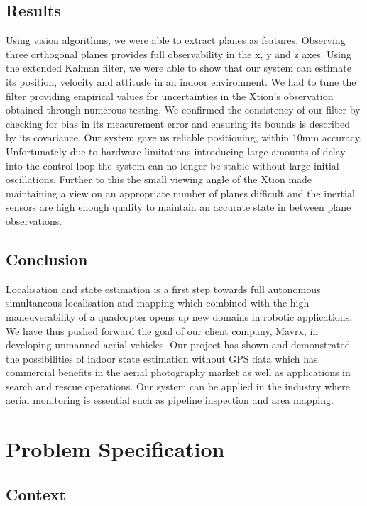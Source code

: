 \documentclass[]{article}
\begin{document}
{\subsection{Results}
Using vision algorithms, we were able to extract planes as features. Observing three orthogonal planes provides full observability in the x, y and z axes. Using the extended Kalman filter, we were able to show that our system can estimate its position, velocity and attitude in an indoor environment. We had to tune the filter providing empirical values for uncertainties in the Xtion's observation obtained through numerous testing. We confirmed the consistency of our filter by checking for bias in its measurement error and ensuring its bounds is described by its covariance. Our system gave us reliable positioning, within 10mm accuracy. Unfortunately due to hardware limitations introducing large amounts of delay into the control loop the system can no longer be stable without large initial oscillations. Further to this the small viewing angle of the Xtion made maintaining a view on an appropriate number of planes difficult and the inertial sensors are high enough quality to maintain an accurate state in between plane observations. 

\subsection{Conclusion}
Localisation and state estimation is a first step towards full autonomous simultaneous localisation and mapping which combined with the high maneuverability of a quadcopter opens up new domains in robotic applications. We have thus pushed forward the goal of our client company, Mavrx, in developing unmanned aerial vehicles. Our project has shown and demonstrated the possibilities of indoor state estimation without GPS data which has commercial benefits in the aerial photography market as well as applications in search and rescue operations. Our system can be applied in the industry where aerial monitoring is essential such as pipeline inspection and area mapping.  


\clearpage


\section{Problem Specification}
\label{sec:problem_specification}

\subsection{Context} %
\label{sub:context}

}
\end{document}
